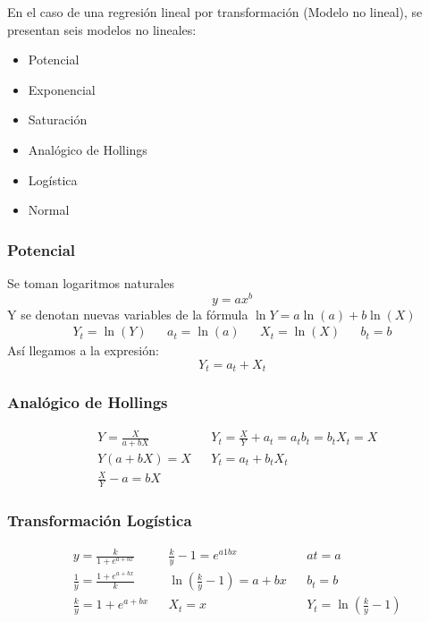 En el caso de una regresión lineal por transformación (Modelo no lineal), se presentan seis modelos no lineales:
\begin{itemize}
    \item Potencial
    \item Exponencial
    \item Saturación
    \item Analógico de Hollings
    \item Logística
    \item Normal
\end{itemize}

\subsubsection{Potencial}

Se toman logaritmos naturales
\begin{equation}
    y = ax^b
\end{equation}
Y se denotan nuevas variables de la fórmula $\ln{Y}=a\ln{(a)}+b\ln{(X)}$
\begin{align*}
    Y_t =\ln{(Y)}&&a_t=\ln{(a)}&&X_t=\ln{(X)}&&b_t = b
\end{align*}
Así llegamos a la expresión:
\begin{equation}
    Y_t = a_t + X_t
\end{equation}

\subsubsection{Analógico de Hollings}

\begin{align*}
    &Y = \frac{X}{a + bX}&&Y_t = \frac{X}{Y} + a_t = a_tb_t = b_tX_t = X\\
    &Y\left(a + bX\right) = X&& Y_t = a_t + b_tX_t\\
    &\frac{X}{Y} - a = bX&&
\end{align*}
\subsubsection{Transformación Logística}

\begin{align*}
    &y = \frac{k}{1 + e^{a + bx}}&& \frac{k}{y} - 1 = e^{a1bx} &&at = a\\
    &\frac{1}{y} = \frac{1 + e^{a + bx}}{k}&& \ln{\left(\frac{k}{y} - 1\right)}= a+ bx&&b_t = b\\
    &\frac{k}{y} = 1 + e^{a + bx}&&X_t = x&&Y_t =\ln{\left(\frac{k}{y} -1\right)}
\end{align*}
